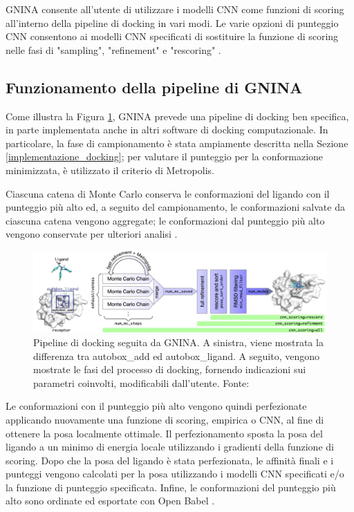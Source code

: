 GNINA consente all'utente di utilizzare i modelli CNN come funzioni di scoring all'interno della pipeline di docking in vari modi. Le varie opzioni di punteggio CNN consentono ai modelli CNN specificati di sostituire la funzione di scoring nelle fasi di "sampling", "refinement" e "rescoring" \cite{mcnutt_gnina_2021}. 


\subsection{Funzionamento della pipeline di GNINA}
Come illustra la Figura \ref{fig:gnina_pipeline}, GNINA prevede una pipeline di docking ben specifica, in parte implementata anche in altri software di docking computazionale. In particolare, la fase di campionamento è stata ampiamente descritta nella Sezione \ref{implementazione_docking};  per valutare il punteggio per la conformazione minimizzata, è utilizzato il criterio di Metropolis.

Ciascuna catena di Monte Carlo conserva le conformazioni del ligando con il punteggio più alto ed, a seguito del campionamento, le conformazioni salvate da ciascuna catena vengono aggregate; le conformazioni dal punteggio più alto vengono conservate per ulteriori analisi \cite{mcnutt_gnina_2021}. 

\vspace{0.5cm}
\begin{figure}[H]
    \centering
    \includegraphics[scale=0.35]{images/chapter2/gnina_pipeline.jpg}
    \caption[Pipeline di docking seguita da GNINA.]{Pipeline di docking seguita da GNINA. A sinistra, viene mostrata la differenza tra autobox_add ed autobox_ligand. A seguito, vengono mostrate le fasi del processo di docking, fornendo indicazioni sui parametri coinvolti, modificabili dall'utente. Fonte: \cite{mcnutt_gnina_2021}}
    \label{fig:gnina_pipeline}
\end{figure}

Le conformazioni con il punteggio più alto vengono quindi perfezionate applicando nuovamente una funzione di scoring, empirica o CNN, al fine di ottenere la posa localmente ottimale.
Il perfezionamento sposta la posa del ligando a un minimo di energia locale utilizzando i gradienti della funzione di scoring. Dopo che la posa del ligando è stata perfezionata, le affinità finali e i punteggi vengono calcolati per la posa utilizzando i modelli CNN specificati e/o la funzione di punteggio specificata. Infine, le conformazioni del punteggio più alto sono ordinate ed esportate con Open Babel \cite{mcnutt_gnina_2021}. 

